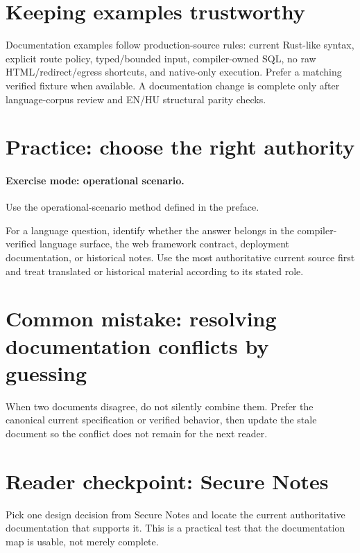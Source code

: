 \section{Keeping examples trustworthy}

Documentation examples follow production-source rules: current Rust-like syntax, explicit route policy, typed/bounded input, compiler-owned SQL, no raw HTML/redirect/egress shortcuts, and native-only execution. Prefer a matching verified  fixture when available. A documentation change is complete only after language-corpus review and EN/HU structural parity checks.

\section{Practice: choose the right authority}
\paragraph{Exercise mode: operational scenario.} Use the operational-scenario method defined in the preface.

For a language question, identify whether the answer belongs in the compiler-verified language surface, the web framework contract, deployment documentation, or historical notes. Use the most authoritative current source first and treat translated or historical material according to its stated role.

\section{Common mistake: resolving documentation conflicts by guessing}
When two documents disagree, do not silently combine them. Prefer the canonical current specification or verified behavior, then update the stale document so the conflict does not remain for the next reader.

\section{Reader checkpoint: Secure Notes}
Pick one design decision from Secure Notes and locate the current authoritative documentation that supports it. This is a practical test that the documentation map is usable, not merely complete.
